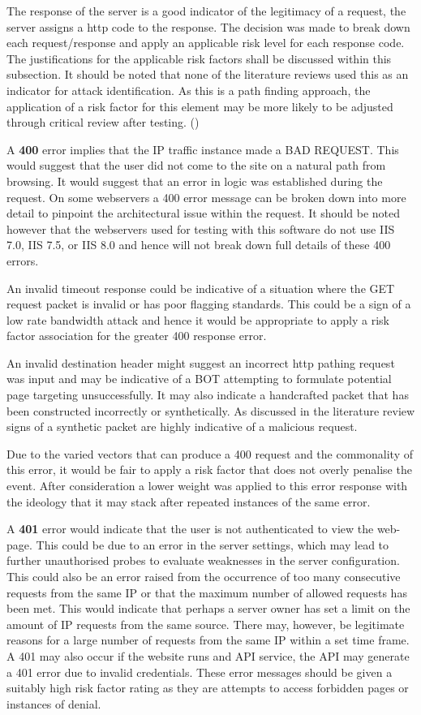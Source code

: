 The response of the server is a good indicator of the legitimacy of a request, the server assigns a http code to the response. The decision was made to break down each request/response and apply an applicable risk level for each response code. The justifications for the applicable risk factors shall be discussed within this subsection. It should be noted that none of the literature reviews used this as an indicator for attack identification. As this is a path finding approach, the application of a risk factor for this element may be more likely to be adjusted through critical review after testing. (\cite{ErrorCodes})

A \textbf{400} error implies that the IP traffic instance made a BAD REQUEST. This would suggest that the user did not come to the site on a natural path from browsing. It would suggest that an error in logic was established during the request. On some webservers a 400 error message can be broken down into more detail to pinpoint the architectural issue within the request. It should be noted however that the webservers used for testing with this software do not use  IIS 7.0, IIS 7.5, or IIS 8.0 and hence will not break down full details of these 400 errors.

An invalid timeout response could be indicative of a situation where the GET request packet is invalid or has poor flagging standards. This could be a sign of a low rate bandwidth attack and hence it would be appropriate to apply a risk factor association for the greater 400 response error. 

An invalid destination header might suggest an incorrect http pathing request was input and may be indicative of a BOT attempting to formulate potential page targeting unsuccessfully. It may also indicate a handcrafted packet that has been constructed incorrectly or synthetically. As discussed in the literature review signs of a synthetic packet are highly indicative of a malicious request.

Due to the varied vectors that can produce a 400 request and the commonality of this error, it would be fair to apply a risk factor that does not overly penalise the event. After consideration a lower weight was applied to this error response with the ideology that it may stack after repeated instances of the same error.

A \textbf{401} error would indicate that the user is not authenticated to view the web-page. This could be due to an error in the server settings, which may lead to further unauthorised probes to evaluate weaknesses in the server configuration. This could also be an error raised from the occurrence of too many consecutive requests from the same IP or that the maximum number of allowed requests has been met. This would indicate that perhaps a server owner has set a limit on the amount of IP requests from the same source. There may, however, be legitimate reasons for a large number of requests from the same IP within a set time frame. A 401 may also occur if the website runs and API service, the API may generate a 401 error due to invalid credentials. These error messages should be given a suitably high risk factor rating as they are attempts to access forbidden pages or instances of denial. 

